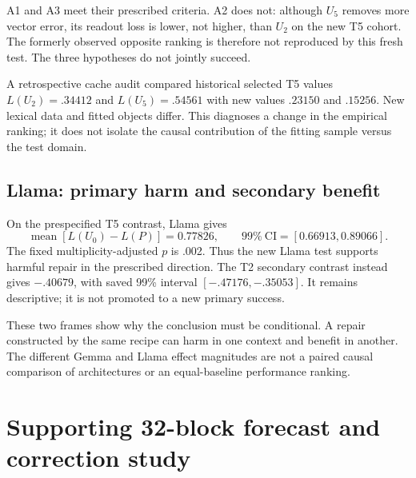 A1 and A3 meet their prescribed criteria. A2 does not: although $U_5$ removes more vector error, its readout loss is lower, not higher, than $U_2$ on the new T5 cohort. The formerly observed opposite ranking is therefore not reproduced by this fresh test. The three hypotheses do not jointly succeed.

A retrospective cache audit compared historical selected T5 values $L(U_2)=.34412$ and $L(U_5)=.54561$ with new values $.23150$ and $.15256$. New lexical data and fitted objects differ. This diagnoses a change in the empirical ranking; it does not isolate the causal contribution of the fitting sample versus the test domain.

\subsection{Llama: primary harm and secondary benefit}
On the prespecified T5 contrast, Llama gives
\[
 \operatorname{mean}[L(U_0)-L(P)]=0.77826,
 \qquad 99\%\ \mathrm{CI}=[0.66913,0.89066].
\]
The fixed multiplicity-adjusted $p$ is .002. Thus the new Llama test supports harmful repair in the prescribed direction. The T2 secondary contrast instead gives $-.40679$, with saved 99\% interval $[-.47176,-.35053]$. It remains descriptive; it is not promoted to a new primary success.

These two frames show why the conclusion must be conditional. A repair constructed by the same recipe can harm in one context and benefit in another. The different Gemma and Llama effect magnitudes are not a paired causal comparison of architectures or an equal-baseline performance ranking.

\section{Supporting 32-block forecast and correction study}
\label{sec:c3}

